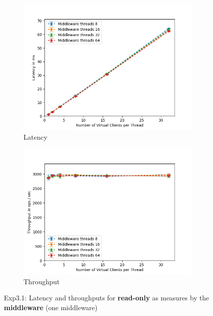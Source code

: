 \documentclass[11pt,a4paper]{article}
\begin{document}
\begin{figure}[H]
\centering
\begin{subfigure}{.5\textwidth}
    \centering
    \includegraphics[width=\textwidth]{img/exp3_1/exp3_1__latency_middleware_write_0.png}
    \caption{Latency}
    \label{fig:mesh1}
\end{subfigure}%
\begin{subfigure}{.5\textwidth}
      \centering
    \includegraphics[width=\textwidth]{img/exp3_1/exp3_1__throughput_middleware_write_0.png}
    \caption{Throughput}
    \label{fig:mesh1}
\end{subfigure}
\caption{Exp3.1: Latency and throughputs for \textbf{read-only} as measures by the \textbf{middleware} (one middleware)}
\label{fig:test}
\end{figure}
\end{document}
